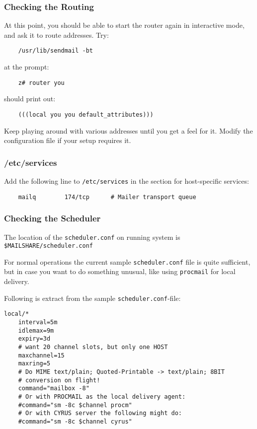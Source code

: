 \subsubsection{Checking the Routing}

At this point, you should be able to start the router again in
interactive mode, and ask it to route addresses.  Try:
\begin{verbatim}
    /usr/lib/sendmail -bt
\end{verbatim}

at the prompt:
\begin{verbatim}
    z# router you
\end{verbatim}

should print out:
\begin{verbatim}
    (((local you you default_attributes)))
\end{verbatim}


Keep playing around with various addresses until you get a feel for it.
Modify the configuration file if your setup requires it.


\subsubsection{/etc/services}

Add the following line to {\tt /etc/services} in the section for
host-specific services:
\begin{verbatim}
    mailq        174/tcp      # Mailer transport queue
\end{verbatim}

\subsubsection{Checking the Scheduler}

The location of the {\tt scheduler.conf} on running system is
{\tt \$MAILSHARE/scheduler.conf}

For normal operations the current sample {\tt scheduler.conf}%
 file is quite sufficient, but in case
you want to do something unusual, like using {\tt procmail} for
local delivery.

Following is extract from the sample  {\tt scheduler.conf}-file:
\begin{verbatim}
local/*
    interval=5m
    idlemax=9m
    expiry=3d
    # want 20 channel slots, but only one HOST
    maxchannel=15
    maxring=5
    # Do MIME text/plain; Quoted-Printable -> text/plain; 8BIT
    # conversion on flight!
    command="mailbox -8"
    # Or with PROCMAIL as the local delivery agent:
    #command="sm -8c $channel procm"
    # Or with CYRUS server the following might do:
    #command="sm -8c $channel cyrus"
\end{verbatim}

